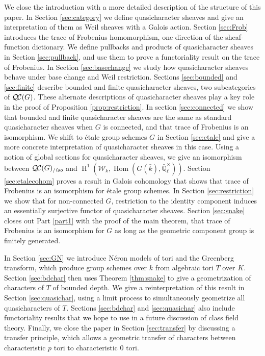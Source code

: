 \documentclass[11pt]{amsart}
\theoremstyle{plain}
\theoremstyle{definition}
\theoremstyle{remark}
\newcommand{\EE}{\mathbb{\bar Q}_\ell}
\newcommand{\bFq}{\bar{k}}
\newcommand{\Fq}{k}
\newcommand{\EEx}{\EE^\times}
\DeclareMathOperator{\Hom}{Hom}
\DeclareMathOperator{\Hh}{H}
\newcommand{\QC}{{\mathcal{Q\hskip-0.8pt C}}}
\newcommand{\QCiso}[1]{\QC(#1)_{/\textit{iso}}}
\newcommand{\Weil}[1]{\mathcal{W}_{#1}}
\begin{document}
We close the introduction with a more detailed description of the structure of this paper.
In Section \ref{sec:category} we define quasicharacter sheaves and give an interpretation of
them as Weil sheaves with a Galois action.
Section \ref{sec:Frob} introduces the trace of Frobenius homomorphism,
one direction of the sheaf-function dictionary.
We define pullbacks and products of quasicharacter sheaves in Section \ref{sec:pullback}, and use
them to prove a functoriality result on the trace of Frobenius.
In Section \ref{sec:basechange} we study how quasicharacter sheaves behave under base change
and Weil restriction.
Sections \ref{sec:bounded} and \ref{sec:finite} describe bounded and finite quasicharacter sheaves,
two subcategories of $\QC(G)$.  These alternate descriptions of quasicharacter sheaves play a key
role in the proof of Proposition \ref{prop:restriction}.
In section \ref{sec:connected} we show that bounded and finite quasicharacter sheaves are the same
as standard quasicharacter sheaves when $G$ is connected, and that trace of Frobenius is an isomorphism.
We shift to \'etale group schemes $G$ in Section \ref{sec:etale} and give a more concrete interpretation
of quasicharacter sheaves in this case.  Using a notion of global sections for quasicharacter sheaves,
we give an isomorphism between $\QCiso{G}$ and $\Hh^1(\Weil{\Fq}, \Hom(G(\bFq), \EEx))$.
Section \ref{sec:etalecohom} proves a result in Galois cohomology that shows that trace of Frobenius is
an isomorphism for \'etale group schemes.
In Section \ref{sec:restriction} we show that for non-connected $G$, restriction to the identity component
induces an essentially surjective functor of quasicharacter sheaves.
Section \ref{sec:snake} closes out Part \ref{part1} with the proof of the main theorem, that trace of Frobenius
is an isomorphism for $G$ as long as the geometric component group is finitely generated.

In Section \ref{sec:GN} we introduce N\'eron models of tori and the Greenberg transform, which produce
group schemes over $\Fq$ from algebraic tori $T$ over $K$.
Section \ref{sec:bdchar} then uses Theorem \ref{thm:snake} to give a geometrization of characters of $T$
of bounded depth.
We give a reinterpretation of this result in Section \ref{sec:quasichar}, using a limit process to simultaneously
geometrize all quasicharacters of $T$.  Sections \ref{sec:bdchar} and \ref{sec:quasichar} also include
functoriality results that we hope to use in a future discussion of class field theory.
Finally, we close the paper in Section \ref{sec:transfer} by discussing a transfer principle, which allows
a geometric transfer of characters between characteristic $p$ tori to characteristic $0$ tori.
\end{document}
